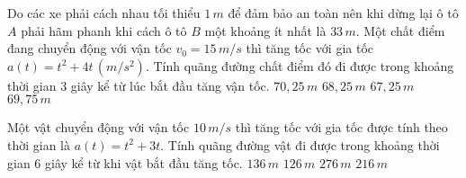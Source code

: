 \begin{ex}%
    Do các xe phải cách nhau tối thiểu $1\,m$ để đảm bảo an toàn nên khi dừng lại ô tô $A$ phải hãm phanh khi cách ô tô $B$ một khoảng ít nhất là $33\,m$. Một chất điểm đang chuyển động với vận tốc $v_0=15\,m/s$ thì tăng tốc với gia tốc $a\left(t \right)=t^2+4t\, \left(m/s^2\right)$. Tính quãng đường chất điểm đó đi được trong khoảng thời gian $3$ giây kể từ lúc bắt đầu tăng vận tốc.
    \choice
    {$70{,}25\, {m}$}
    {$68{,}25\, {m}$}
    {$67{,}25\, {m}$}
    {\True $69{,}75\, {m}$}
\end{ex}

\begin{ex}%
    Một vật chuyển động với vận tốc $10\,m/s$ thì tăng tốc với gia tốc được tính theo thời gian là $a\left(t \right)=t^2+3t$. Tính quãng đường vật đi được trong khoảng thời gian $6$ giây kể từ khi vật bắt đầu tăng tốc.
    \choice
    {$136\,{m}$}
    {$126\,{m}$}
    {$276\,{m}$}
    {\True $216\,{m}$}
\end{ex}


